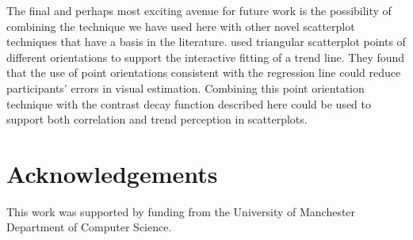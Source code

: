 \documentclass[preprint, 3p,
authoryear]{elsarticle} %
\begin{document}
The final and perhaps most exciting avenue for future work is the
possibility of combining the technique we have used here with other
novel scatterplot techniques that have a basis in the literature.
\citet{liu_2021} used triangular scatterplot points of different
orientations to support the interactive fitting of a trend line. They
found that the use of point orientations consistent with the regression
line could reduce participants' errors in visual estimation. Combining
this point orientation technique with the contrast decay function
described here could be used to support both correlation and trend
perception in scatterplots.

\hypertarget{acknowledgements}{%
\section{Acknowledgements}\label{acknowledgements}}

This work was supported by funding from the University of Manchester
Department of Computer Science.

\renewcommand\refname{References}

\end{document}
